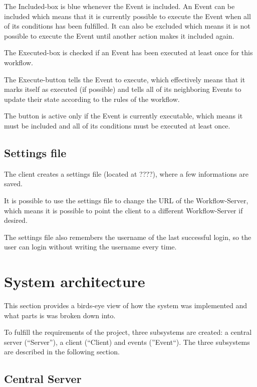 The Included-box is blue whenever the Event is included. An Event can be
included which means that it is currently possible to execute the Event
when all of its conditions has been fulfilled. It can also be excluded
which means it is not possible to execute the Event until another action
makes it included again.

The Executed-box is checked if an Event has been executed at least once
for this workflow.

The Execute-button tells the Event to execute, which effectively means
that it marks itself as executed (if possible) and tells all of its
neighboring Events to update their state according to the rules of the
workflow.

The button is active only if the Event is currently executable, which
means it must be included and all of its conditions must be executed at
least once.

\section{Settings file}\label{settings-file}

The client creates a settings file (located at ????), where a few
informations are saved.

It is possible to use the settings file to change the URL of the
Workflow-Server, which means it is possible to point the client to a
different Workflow-Server if desired.

The settings file also remembers the username of the last successful
login, so the user can login without writing the username every time.

\chapter{System architecture}\label{system-architecture}

This section provides a birds-eye view of how the system was implemented
and what parts is was broken down into.

To fulfill the requirements of the project, three subsystems are
created: a central server (``Server''), a client (``Client) and events
(''Event``). The three subsystems are described in the following
section.

\section{Central Server}\label{central-server}

